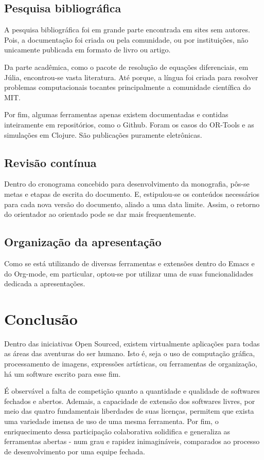 \documentclass[
12pt,				%
openright,			%
oneside,			%
a4paper,			%
brazil,				%
english,			%
]{abntex2}
\begin{document}
\section{Pesquisa bibliográfica}
A pesquisa bibliográfica foi em grande parte encontrada em sites sem
autores. Pois, a documentação foi criada ou pela comunidade, ou por
instituições, não unicamente publicada em formato de livro ou artigo.

Da parte acadêmica, como o pacote de resolução de equações
diferenciais, em Júlia, encontrou-se vasta literatura. Até porque, a
língua foi criada para resolver problemas computacionais tocantes
principalmente a comunidade científica do MIT.

Por fim, algumas ferramentas apenas existem documentadas e contidas
inteiramente em repositórios, como o Github. Foram os casos do
OR-Tools e as simulações em Clojure. São publicações puramente eletrônicas.

\section{Revisão contínua}

Dentro do cronograma concebido para desenvolvimento da monografia,
pôs-se metas e etapas de escrita do documento. E, estipulou-se os
conteúdos necessários para cada nova versão do documento, aliado a uma
data limite. Assim, o retorno do orientador ao orientado pode se dar
mais frequentemente.

\section{Organização da apresentação}

Como se está utilizando de diversas ferramentas e extensões dentro do
Emacs e do Org-mode, em particular, optou-se por utilizar uma de suas
funcionalidades dedicada a apresentações. 

\chapter{Conclusão}
Dentro das iniciativas Open Sourced, existem virtualmente aplicações
para todas as áreas das aventuras do ser humano. Isto é, seja o uso de
computação gráfica, processamento de imagens, expressões artísticas,
ou ferramentas de organização, há um software escrito para esse fim.

É observável a falta de competição quanto a quantidade e qualidade de
softwares fechados e abertos. Ademais, a capacidade de
extensão dos softwares livres, por meio das quatro fundamentais
liberdades de suas licenças, permitem que exista uma variedade imensa
de uso de uma mesma ferramenta. Por fim, o enriquecimento dessa
participação colaborativa solidifica e generaliza as ferramentas
abertas - num grau e rapidez inimagináveis, comparados ao processo de
desenvolvimento por uma equipe fechada.
\end{document}
